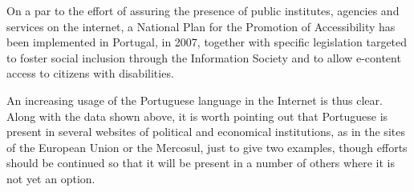 \begin{multicols}{2}

On a par to the effort of assuring the presence of public institutes, agencies and services on the internet, a National Plan for the Promotion of Accessibility has been implemented in Portugal, in 2007, together with specific legislation\cite{umic} targeted to foster social inclusion through the Information Society and to allow e-content access to citizens with disabilities.

An increasing usage of the Portuguese language in the Internet is thus clear. Along with the data shown above, it is worth pointing out that Portuguese is present in several websites of political and economical institutions, as in the sites of the European Union or the Mercosul, just to give two examples, though efforts should be continued so that it will be present in a number of others where it is not yet an option.
\end{multicols}

\clearpage


